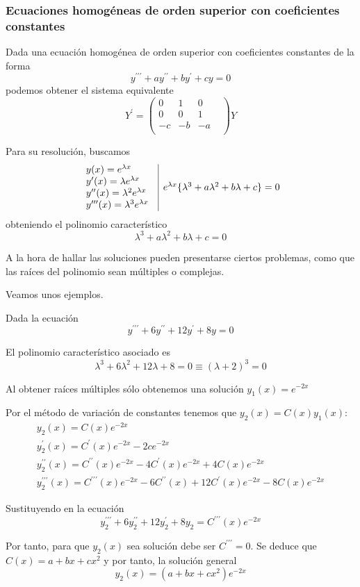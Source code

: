 \subsubsection{Ecuaciones homogéneas de orden superior con coeficientes constantes}
Dada una ecuación homogénea de orden superior con coeficientes constantes de la forma
 $$y^{\prime\prime\prime} + ay^{\prime\prime}+by^{\prime}+cy = 0$$ podemos obtener el sistema equivalente
$$Y^\prime = \begin{pmatrix}
0& 1& 0\\
0& 0& 1&\\
-c& -b& -a\\
\end{pmatrix}Y$$

Para su resolución, buscamos
$$\begin{array}{c | c}

\begin{array}{l}
y(x) = e^{\lambda x}\\
y^\prime(x) = \lambda e^{\lambda x}\\
y^{\prime\prime}(x) = \lambda^2 e^{\lambda x}\\
y^{\prime\prime\prime}(x) = \lambda^3 e^{\lambda x}\\
\end{array} & e^{\lambda x} \{ \lambda^3 + a\lambda^2 + b \lambda + c \} = 0
\end{array}
$$
obteniendo el polinomio característico $$\lambda^3 + a\lambda^2 + b \lambda + c = 0$$

A la hora de hallar las soluciones pueden presentarse ciertos problemas, como que las raíces del polinomio sean múltiples o complejas.

Veamos unos ejemplos.

\begin{example}
Dada la ecuación
$$y^{\prime\prime\prime} + 6 y^{\prime\prime} + 12y^\prime + 8y = 0$$

El polinomio característico asociado es $$ \lambda^3 + 6\lambda^2 + 12\lambda + 8 = 0 \equiv (\lambda + 2)^3 = 0$$

Al obtener raíces múltiples sólo obtenemos una solución $y_1(x) = e^{-2x}$

Por el método de variación de constantes tenemos que $y_2(x) = C(x) y_1(x)$:
$$\begin{array}{l}
y_2(x) = C(x) e^{-2x}\\
y_2^\prime(x) = C^\prime(x) e^{-2x}-2ce^{-2x}\\
y_2^{\prime\prime}(x) = C^{\prime\prime}(x) e^{-2x}-4C^\prime(x) e^{-2x}+4C(x)e^{-2x}\\
y_2^{\prime\prime\prime}(x) = C^{\prime\prime\prime}(x) e^{-2x}-6C^{\prime\prime}(x) +12C^\prime(x) e^{-2x}-8C(x)e^{-2x}
\end{array}
$$

Sustituyendo en la ecuación $$y^{\prime\prime\prime}_2+6y^{\prime\prime}_2+12y^\prime_2+8y_2 = C^{\prime\prime\prime}(x) e^{-2x}$$

Por tanto, para que $y_2(x)$ sea solución debe ser $C^{\prime\prime\prime} = 0$. Se deduce que $C(x) = a+bx+cx^2$ y por tanto, la solución general $$y_2(x) = (a+bx+cx^2)e^{-2x}$$
\end{example}

